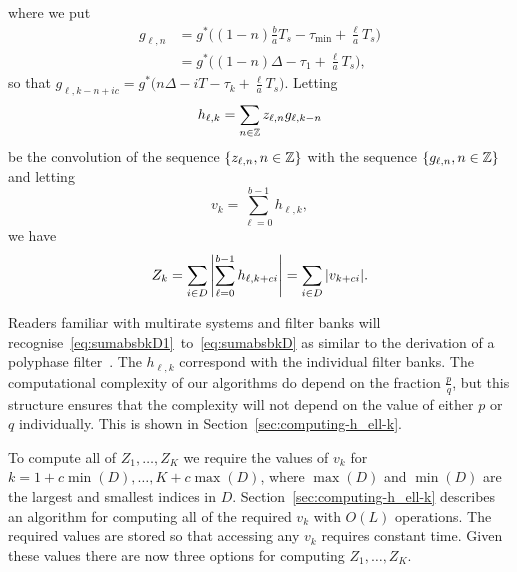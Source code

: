 \documentclass[journal]{IEEEtranTCOM}
\begin{document}
where we put
\begin{equation}\label{eq:gln}
\begin{split}
g_{\ell,n} &= g^*\big( (1-n)\tfrac{b}{a}T_s - \tau_{\text{min}} + \tfrac{\ell}{a}T_s\big) \\
&= g^*\big( (1-n)\Delta - \tau_1 + \tfrac{\ell}{a}T_s\big),
\end{split}
\end{equation}
so that $g_{\ell,k-n+ic} = g^*\big( n\Delta - iT - \tau_{k} + \tfrac{\ell}{a}T_s\big)$.  Letting
\begin{equation}\label{eq:hkseqdefn}
h_{\ell,k} = \sum_{n\in\ints}z_{\ell,n}g_{\ell,k-n}
\end{equation}
be the convolution of the sequence $\{z_{\ell,n}, n \in {\mathbb Z}\}$ with the sequence $\{g_{\ell,n},n \in {\mathbb Z}\}$ and letting
\begin{equation}\label{eq:bkdefn}
v_k = \sum_{\ell=0}^{b-1}h_{\ell,k},
\end{equation}
we have
\begin{equation} \label{eq:sumabsbkD}
Z_k = \sum_{i \in D} \abs{\sum_{\ell = 0}^{b-1} h_{\ell,k+ci}} = \sum_{i \in D} \abs{v_{k+ci}}.
\end{equation}

Readers familiar with multirate systems and filter banks will recognise~\eqref{eq:sumabsbkD1}~to~\eqref{eq:sumabsbkD} as similar to the derivation of a polyphase filter~\cite{Vaidyanthan_multirate_polyphase_1993,Crochiere_polyphase_procieee_1981}.  The $h_{\ell,k}$ correspond with the individual filter banks.  The computational complexity of our algorithms do depend on the fraction $\tfrac{p}{q}$, but this structure ensures that the complexity will not depend on the value of either $p$ or $q$ individually.  This is shown in Section~\ref{sec:computing-h_ell-k}.  %

To compute all of $Z_1, \dots, Z_K$ we require the values of $v_k$ for $k = 1 + c\min(D), \dots, K + c\max(D)$, where $\max(D)$ and $\min(D)$ are the largest and smallest indices in $D$.  %
Section~\ref{sec:computing-h_ell-k} describes an algorithm for computing all of the required $v_{k}$ with $O(L)$ operations.  
The required values are stored so that accessing any $v_k$ requires constant time.  Given these values there are now three options for computing $Z_1,\dots,Z_K$.  
\end{document}

